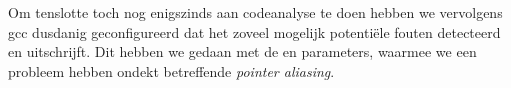 Om tenslotte toch nog enigszinds aan codeanalyse te doen hebben we vervolgens \ac{gcc} dusdanig geconfigureerd dat het zoveel mogelijk potentiële fouten detecteerd en uitschrijft. Dit hebben we gedaan met de  en  parameters, waarmee we een probleem hebben ondekt betreffende \emph{pointer aliasing}.
 